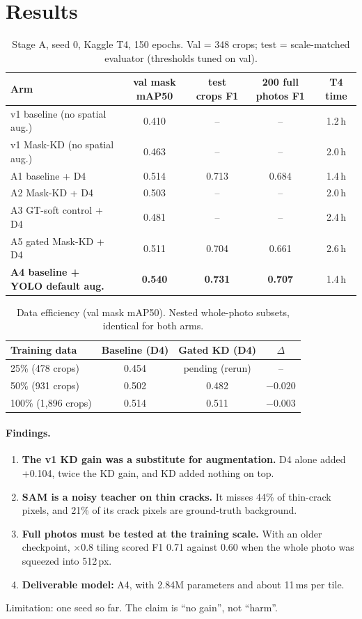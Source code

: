 \documentclass[11pt,a4paper]{article}
\begin{document}
\section{Results}
\begin{table}[h]\centering\small
\caption{Stage A, seed 0, Kaggle T4, 150 epochs. Val = 348 crops; test = scale-matched evaluator (thresholds tuned on val).}
\begin{tabular}{lcccc}
\toprule
Arm & val mask mAP50 & test crops F1 & 200 full photos F1 & T4 time\\
\midrule
v1 baseline (no spatial aug.) & 0.410 & -- & -- & 1.2\,h\\
v1 Mask-KD (no spatial aug.) & 0.463 & -- & -- & 2.0\,h\\
\midrule
A1 baseline + D4 & 0.514 & 0.713 & 0.684 & 1.4\,h\\
A2 Mask-KD + D4 & 0.503 & -- & -- & 2.0\,h\\
A3 GT-soft control + D4 & 0.481 & -- & -- & 2.4\,h\\
A5 gated Mask-KD + D4 & 0.511 & 0.704 & 0.661 & 2.6\,h\\
\textbf{A4 baseline + YOLO default aug.} & \textbf{0.540} & \textbf{0.731} & \textbf{0.707} & 1.4\,h\\
\bottomrule
\end{tabular}
\end{table}

\begin{table}[h]\centering\small
\caption{Data efficiency (val mask mAP50). Nested whole-photo subsets, identical for both arms.}
\begin{tabular}{lccc}
\toprule
Training data & Baseline (D4) & Gated KD (D4) & $\Delta$\\
\midrule
25\% (478 crops) & 0.454 & pending (rerun) & --\\
50\% (931 crops) & 0.502 & 0.482 & $-0.020$\\
100\% (1,896 crops) & 0.514 & 0.511 & $-0.003$\\
\bottomrule
\end{tabular}
\end{table}

\paragraph{Findings.}
\begin{enumerate}
\item \textbf{The v1 KD gain was a substitute for augmentation.} D4 alone added +0.104, twice the KD gain, and KD added nothing on top.
\item \textbf{SAM is a noisy teacher on thin cracks.} It misses 44\% of thin-crack pixels, and 21\% of its crack pixels are ground-truth background.
\item \textbf{Full photos must be tested at the training scale.} With an older checkpoint, ${\times}0.8$ tiling scored F1 0.71 against 0.60 when the whole photo was squeezed into 512\,px.
\item \textbf{Deliverable model:} A4, with 2.84M parameters and about 11\,ms per tile.
\end{enumerate}
Limitation: one seed so far. The claim is ``no gain'', not ``harm''.
\end{document}
